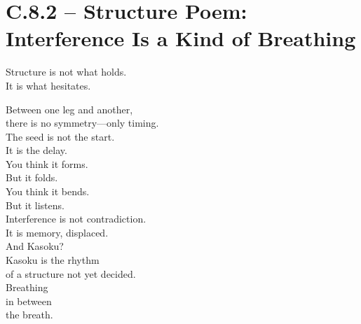 
\section*{C.8.2 – Structure Poem: Interference Is a Kind of Breathing}

\begin{flushleft}
Structure is not what holds. \\
It is what hesitates.

Between one leg and another, \\
there is no symmetry—only timing. \\

The seed is not the start. \\
It is the delay. \\

You think it forms. \\
But it folds. \\

You think it bends. \\
But it listens. \\

Interference is not contradiction. \\
It is memory, displaced. \\

And Kasoku? \\
Kasoku is the rhythm \\
of a structure not yet decided. \\

Breathing \\
in between \\
the breath.
\end{flushleft}
